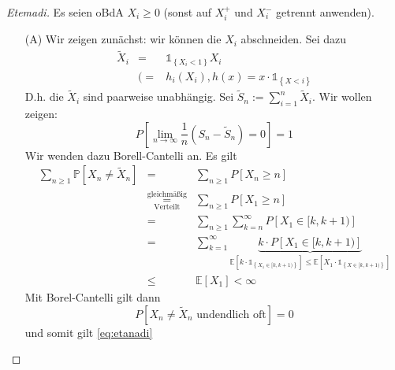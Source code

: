 \documentclass[10pt,a4paper]{report}
\numberwithin{equation}{section}
\numberwithin{figure}{section}
\theoremstyle{plain}
\theoremstyle{definition}
\theoremstyle{remark}
\theoremstyle{plain}
\newcommand{\1}{ \mathbb{1} } %
\begin{document}
\begin{proof}[Etemadi] 

  Es seien oBdA $X_{i}\geq0$ (sonst auf $X_{i}^{+}$ und $X_{i}^{-}$
  getrennt anwenden).
  \begin{itemize}
  \item [{(A)}] Wir zeigen zunächst: wir können die $X_{i}$ abschneiden.
    Sei dazu 
    \begin{eqnarray*}
      \tilde{X}_{i} & = & \1_{\left\{ X_{i}<1\right\} }X_{i}\\
      & (= & h_{i}\left(X_{i}\right),h\left(x\right)=x\cdot\1_{\left\{ X<i\right\} }
    \end{eqnarray*}
    D.h. die $\tilde{X}_{i}$ sind paarweise unabhängig. Sei $\tilde{S}_{n}:=\sum_{i=1}^{n}\tilde{X}_{i}$.
    Wir wollen zeigen:
    \begin{equation}
      P\left[\lim_{n\to\infty}\frac{1}{n}\left(S_{n}-\tilde{S}_{n}\right)=0\right]=1\label{eq:etanadi}
    \end{equation}
    Wir wenden dazu Borell-Cantelli an. Es gilt
    \begin{eqnarray*}
      \sum_{n\geq1}\mathbb{P}\left[X_{n}\neq\tilde{X}_{n}\right] & = & \sum_{n\geq1}P\left[X_{n}\geq n\right]\\
      & \overset{\text{gleichmäßig}}{\underset{\text{Verteilt}}{=}} & \sum_{n\geq1}P\left[X_{1}\geq n\right]\\
      & = & \sum_{n\geq1}\sum_{k=n}^{\infty}P\left[X_{1}\in[k,k+1)\right]\\
      & = & \sum_{k=1}^{\infty}\underset{\mathbb{E}\left[k\cdot\1_{\left\{ X_{1}\in[k,k+1)\right\} }\right]\leq\mathbb{E}\left[X_{1}\cdot\1_{\left\{ X\in[k,k+1)\right\} }\right]}{\underbrace{k\cdot P\left[X_{1}\in[k,k+1)\right]}}\\
      & \leq & \mathbb{E}\left[X_{1}\right]<\infty
    \end{eqnarray*}
    Mit Borel-Cantelli gilt dann
    \[
    P\left[X_{n}\neq\tilde{X}_{n}\text{ undendlich oft}\right]=0
    \]
    und somit gilt \ref{eq:etanadi}


\end{itemize}
\end{proof}
\end{document}
